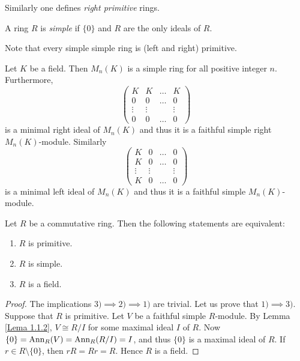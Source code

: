 Similarly one defines \emph{right primitive} rings. 

\begin{definition}
A ring $R$ is \emph{simple} if $\{0\}$ and $R$ are the only ideals of $R$.
\end{definition}

Note that every simple simple ring is (left and right) primitive.

\begin{example}
Let $K$ be a field. Then $M_n(K)$ is a simple ring for all positive integer $n$. Furthermore,
\[
\left(\begin{array}{cccc} K&K&\ldots&K\\
0&0&\ldots&0\\
\vdots &\vdots &&\vdots\\
0&0&\ldots&0\end{array}\right)
\]
is a minimal right ideal of $M_n(K)$ and thus it is a faithful simple
right $M_n(K)$-module. Similarly
\[
\left(\begin{array}{cccc} K&0&\ldots&0\\
	K&0&\ldots&0\\
	\vdots &\vdots &&\vdots\\
	K&0&\ldots&0\end{array}\right)
\]
is a minimal left ideal of $M_n(K)$ and thus it is a faithful simple
$M_n(K)$-module. 
\end{example}

\begin{proposition}
\label{Prop1.2.1}
Let $R$ be a commutative ring. Then the following statements are equivalent:
\begin{enumerate}
\item $R$ is primitive.
\item $R$ is simple.
\item $R$ is a field.
\end{enumerate}
\end{proposition}

\begin{proof}
    The implications $3)\implies 2)\implies 1)$ are trivial. Let us prove that $1)\implies 3)$. 
    Suppose that $R$ is primitive. Let $V$ be
a faithful simple $R$-module. By Lemma \ref{Lema 1.1.2}, $V\cong R/I$ for some maximal ideal $I$ of $R$. 
Now $\{0\}=\operatorname{Ann}_R(V)=\operatorname{Ann}_R(R/I)=I$, and thus $\{0\}$ is a maximal ideal of $R$. If $r\in R\setminus \{ 0\}$, then
$rR=Rr=R$. Hence $R$ is a field.
\end{proof}

